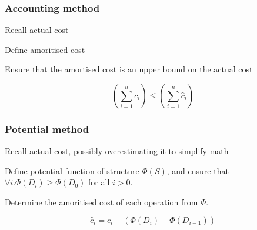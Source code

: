 \documentclass[10pt, a4paper,landscape]{article}
\begin{document}
\begin{multicols*}{4}
\subsubsection{Accounting method}
\begin{compactitem}
    \item Recall actual cost
    \item Define amoritised cost
    \item Ensure that the amortised cost is an upper bound on the actual cost
\end{compactitem}

\[
  (\sum_{i =1}^{n} c_i) \leq (\sum_{i =1}^{n} \hat{c}_i) 
\]

\subsubsection{Potential method}
\begin{compactitem}
    \item Recall actual cost, possibly overestimating it to simplify math
    \item Define potential function of structure $\Phi(S)$, and ensure that $\forall i. \Phi(D_i) \geq \Phi(D_0)$ for all $i > 0$.
    \item Determine the amoritised cost of each operation from $\Phi$.
\end{compactitem}

\[\hat{c}_i = c_i + (\Phi(D_i) - \Phi(D_{i - 1}))\]


\end{multicols*}
\end{document}
